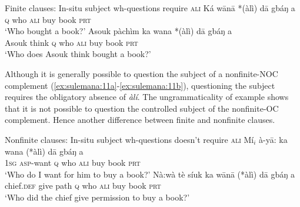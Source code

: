 \documentclass[output=paper,colorlinks,citecolor=brown]{langscibook}
\begin{document}

\ea%
    \label{ex:sulemana:10} 
    Finite clauses: In-situ subject wh-questions require \textsc{ali}
    \ea%
    \label{ex:sulemana:10a}
    \gll    Ká wānā *(àlì) dā gbáŋ a\\
            \textsc{q} who \textsc{ali} buy book \textsc{prt} \\
    \glt    `Who bought a book?' 
    \ex%
    \gll    Asouk pàchìm ka wana  *(àlì) dā gbáŋ a\\
            Asouk think \textsc{q} who \textsc{ali}  buy book \textsc{prt} \\
    \glt    `Who does Asouk think bought  a book?' 
    \z
\z

Although it is generally possible to question the subject of a nonfinite-NOC complement (\ref{ex:sulemana:11a}-\ref{ex:sulemana:11b}), questioning the subject requires the obligatory absence of {\it{àlí}}. 
The ungrammaticality of example  shows that it is not possible to question the controlled subject of the nonfinite-OC complement. Hence another difference between finite and nonfinite clauses. %

\ea%
    \label{ex:sulemana:11} 
    Nonfinite clauses: In-situ subject wh-questions doesn't require \textsc{ali}
    \ea%
    \label{ex:sulemana:11a}
    \gll    Mí$_i$ à-yā: ka wana (*àlì) dā gbáŋ a \\
            \textsc{1sg} \textsc{asp}-want \textsc{q} who  \textsc{ali}  buy book \textsc{prt}  \\
    \glt    `Who do I want for him to buy a book?' 
    \ex%
    \label{ex:sulemana:11b}
    \gll    Nà:wà tè síuk  ka wānā (*àlì) dā gbáŋ a \\
            chief.\textsc{def} give path \textsc{q} who  \textsc{ali} buy book \textsc{prt} \\
    \glt    `Who did the chief give permission to buy a book?' 
    \z
\z
\end{document}
